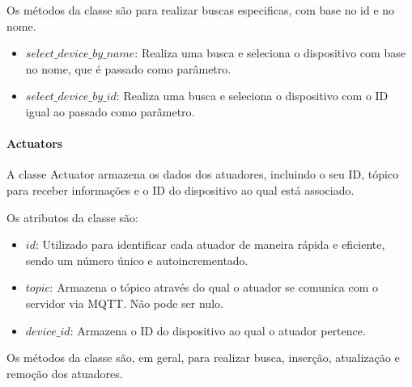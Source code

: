 \documentclass[conference, a4paper, 12pt]{IEEEtran}
\begin{document}
Os métodos da classe são para realizar buscas especificas, com base no id e no nome.

\begin{itemize}
  \item $select\_device\_by\_name$: Realiza uma busca e seleciona o dispositivo com base no nome, que é passado como parâmetro.
    \item $select\_device\_by\_id$: Realiza uma busca e seleciona o dispositivo com o ID igual ao passado como parâmetro.
\end{itemize}

\paragraph{Actuators}
A classe Actuator armazena os dados dos atuadores, incluindo o seu ID, tópico para receber informações e o ID do dispositivo ao qual está associado.

Os atributos da classe são:
\begin{itemize}
  \item $id$: Utilizado para identificar cada atuador de maneira rápida e eficiente, sendo um número único e autoincrementado.
  \item $topic$: Armazena o tópico através do qual o atuador se comunica com o servidor via MQTT. Não pode ser nulo.
  \item $device\_id$:  Armazena o ID do dispositivo ao qual o atuador pertence.
\end{itemize}

Os métodos da classe são, em geral, para realizar busca, inserção, atualização e remoção dos atuadores.
\end{document}
